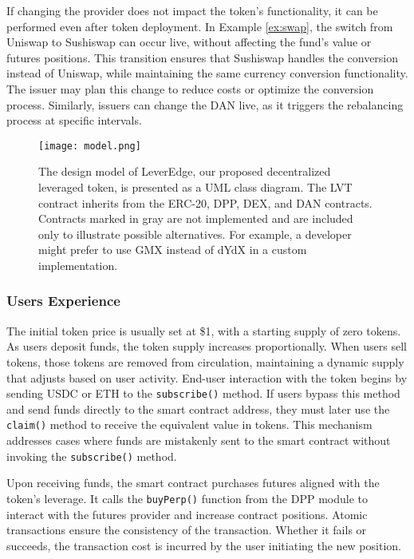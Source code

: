 If changing the provider does not impact the token's functionality, it can be performed even after token deployment. In Example \ref{ex:swap}, the switch from Uniswap to Sushiswap can occur live, without affecting the fund's value or futures positions. This transition ensures that Sushiswap handles the conversion instead of Uniswap, while maintaining the same currency conversion functionality. The issuer may plan this change to reduce costs or optimize the conversion process. Similarly, issuers can change the DAN live, as it triggers the rebalancing process at specific intervals.

\begin{figure}[p]
	\centering
	\texttt{[image: model.png]}
	\caption[LeverEdge design model]{The design model of LeverEdge, our proposed decentralized leveraged token, is presented as a UML class diagram. The LVT contract inherits from the ERC-20, DPP, DEX, and DAN contracts. Contracts marked in gray are not implemented and are included only to illustrate possible alternatives. For example, a developer might prefer to use GMX instead of dYdX in a custom implementation.}
	\label{fig:model}
\end{figure}

\subsubsection{Users Experience}
The initial token price is usually set at \$1, with a starting supply of zero tokens. As users deposit funds, the token supply increases proportionally. When users sell tokens, those tokens are removed from circulation, maintaining a dynamic supply that adjusts based on user activity. End-user interaction with the token begins by sending USDC or ETH to the \texttt{subscribe()} method. If users bypass this method and send funds directly to the smart contract address, they must later use the \texttt{claim()} method to receive the equivalent value in tokens. This mechanism addresses cases where funds are mistakenly sent to the smart contract without invoking the \texttt{subscribe()} method.

Upon receiving funds, the smart contract purchases futures aligned with the token's leverage. It calls the \texttt{buyPerp()} function from the DPP module to interact with the futures provider and increase contract positions. Atomic transactions ensure the consistency of the transaction. Whether it fails or succeeds, the transaction cost is incurred by the user initiating the new position. 

